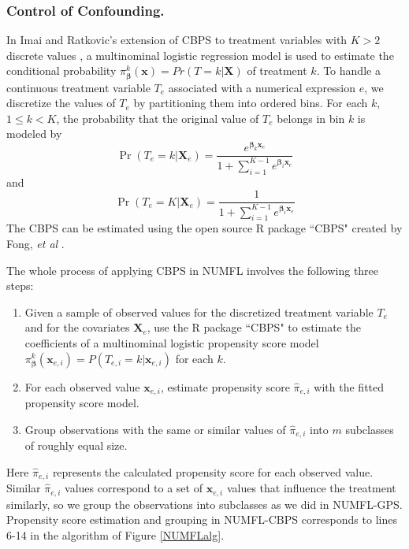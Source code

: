 \documentclass[times]{stvrauth}
\begin{document}
\subsubsection{Control of Confounding.}
In Imai and Ratkovic's extension of CBPS to treatment variables with $K>2$ discrete values \cite{Hansen1982}, a multinominal logistic regression model is used to estimate the conditional probability $\pi_{\pmb \beta}^k (\pmb{x})=Pr⁡(T=k |  \pmb{X})$ of treatment $k$. To handle a continuous treatment variable $T_e$ associated with a numerical expression $e$, we discretize the values of $T_e$ by partitioning them into ordered bins.  For each $k$, $1 \leq k<K$, the probability  that the original value of $T_e$ belongs in bin $k$ is modeled by
\begin{equation*}
\Pr ({T_e} = k|{\pmb{X}_e}) = \frac{{{e^{{{\pmb \beta} _k}{\pmb{x}_e}}}}}{{1 + \sum\nolimits_{i = 1}^{K - 1} {{e^{{{\pmb \beta} _i}{\pmb{x}_e}}}} }}
\end{equation*}
and
\begin{equation*}
\Pr ({T_e} = K|{\pmb{X}_e}) = \frac{1}{{1 + \sum\nolimits_{i = 1}^{K - 1} {{e^{{{\pmb \beta} _i}{\pmb{x}_e}}}} }}
\end{equation*}
The CBPS can be estimated using the open source R package ``CBPS" created by Fong, {\it et al} \cite{CBPS}.

The whole process of applying CBPS in NUMFL involves the following three steps:
\begin{enumerate}
\item 	Given a sample of observed values for the discretized treatment variable $T_e$ and for the covariates $\pmb{X}_e$, use the R package ``CBPS" to estimate the coefficients of a multinominal logistic propensity score model $\pi _{\pmb{\beta}} ^k({\pmb{x}_{e,i}}) = P({T_{e,i}} = k|{\pmb{x}_{e,i}})$ for each $k$.
\item	For each observed value ${\pmb x}_{e,i}$, estimate propensity score $\hat \pi _{e,i}$ with the fitted propensity score model.
\item Group observations with the same or similar values of $\hat \pi _{e,i}$ into $m$ subclasses of roughly equal size.
\end{enumerate}

Here $\hat \pi _{e,i}$ represents the calculated propensity score for each observed value.  Similar $\hat \pi _{e,i}$ values correspond to a set of $\pmb{x}_{e,i}$ values that influence the treatment similarly, so we group the observations into subclasses as we did in NUMFL-GPS.  Propensity score estimation and grouping in NUMFL-CBPS corresponds to lines 6-14 in the algorithm of Figure \ref{NUMFLalg}.
\end{document}
